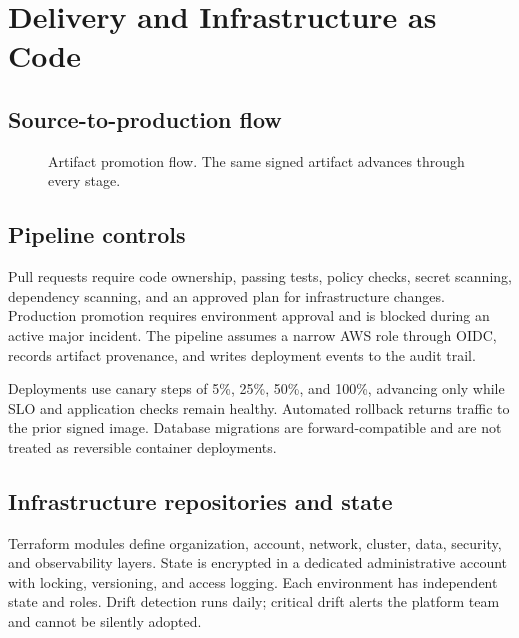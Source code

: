 \section{Delivery and Infrastructure as Code}

\subsection{Source-to-production flow}

\begin{figure}[htbp]
\centering
{}
\caption{Artifact promotion flow. The same signed artifact advances through every stage.}
\label{fig:pipeline}
\end{figure}

\subsection{Pipeline controls}

Pull requests require code ownership, passing tests, policy checks, secret scanning, dependency scanning, and an approved plan for infrastructure changes. Production promotion requires environment approval and is blocked during an active major incident. The pipeline assumes a narrow AWS role through OIDC, records artifact provenance, and writes deployment events to the audit trail.

Deployments use canary steps of 5\%, 25\%, 50\%, and 100\%, advancing only while SLO and application checks remain healthy. Automated rollback returns traffic to the prior signed image. Database migrations are forward-compatible and are not treated as reversible container deployments.

\subsection{Infrastructure repositories and state}

Terraform modules define organization, account, network, cluster, data, security, and observability layers. State is encrypted in a dedicated administrative account with locking, versioning, and access logging. Each environment has independent state and roles. Drift detection runs daily; critical drift alerts the platform team and cannot be silently adopted.

